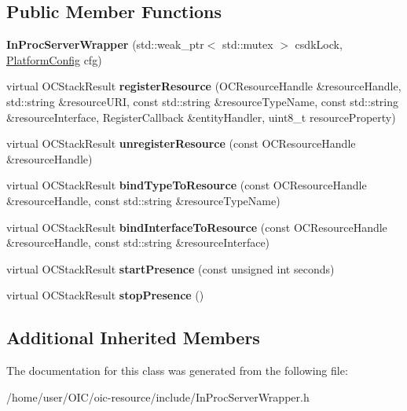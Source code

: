 \subsection*{Public Member Functions}
\begin{DoxyCompactItemize}
\item 
\hypertarget{classOC_1_1InProcServerWrapper_a7d57ed7b6fadd5136547470846f432c2}{}{\bfseries In\+Proc\+Server\+Wrapper} (std\+::weak\+\_\+ptr$<$ std\+::mutex $>$ csdk\+Lock, \hyperlink{structOC_1_1PlatformConfig}{Platform\+Config} cfg)\label{classOC_1_1InProcServerWrapper_a7d57ed7b6fadd5136547470846f432c2}

\item 
\hypertarget{classOC_1_1InProcServerWrapper_a1f539d6b9e35e56f585aa181de176d33}{}virtual O\+C\+Stack\+Result {\bfseries register\+Resource} (O\+C\+Resource\+Handle \&resource\+Handle, std\+::string \&resource\+U\+R\+I, const std\+::string \&resource\+Type\+Name, const std\+::string \&resource\+Interface, Register\+Callback \&entity\+Handler, uint8\+\_\+t resource\+Property)\label{classOC_1_1InProcServerWrapper_a1f539d6b9e35e56f585aa181de176d33}

\item 
\hypertarget{classOC_1_1InProcServerWrapper_a4d3186195070f4e3996ae19103bd9940}{}virtual O\+C\+Stack\+Result {\bfseries unregister\+Resource} (const O\+C\+Resource\+Handle \&resource\+Handle)\label{classOC_1_1InProcServerWrapper_a4d3186195070f4e3996ae19103bd9940}

\item 
\hypertarget{classOC_1_1InProcServerWrapper_afd20915bfc9effddccf6bd5f5869d453}{}virtual O\+C\+Stack\+Result {\bfseries bind\+Type\+To\+Resource} (const O\+C\+Resource\+Handle \&resource\+Handle, const std\+::string \&resource\+Type\+Name)\label{classOC_1_1InProcServerWrapper_afd20915bfc9effddccf6bd5f5869d453}

\item 
\hypertarget{classOC_1_1InProcServerWrapper_af8853a36566a2f654d50fccf0782d5f3}{}virtual O\+C\+Stack\+Result {\bfseries bind\+Interface\+To\+Resource} (const O\+C\+Resource\+Handle \&resource\+Handle, const std\+::string \&resource\+Interface)\label{classOC_1_1InProcServerWrapper_af8853a36566a2f654d50fccf0782d5f3}

\item 
\hypertarget{classOC_1_1InProcServerWrapper_a51116f23d4668a00e9f0ccf797f54b72}{}virtual O\+C\+Stack\+Result {\bfseries start\+Presence} (const unsigned int seconds)\label{classOC_1_1InProcServerWrapper_a51116f23d4668a00e9f0ccf797f54b72}

\item 
\hypertarget{classOC_1_1InProcServerWrapper_a831fe208084942ca65b350765cf4902e}{}virtual O\+C\+Stack\+Result {\bfseries stop\+Presence} ()\label{classOC_1_1InProcServerWrapper_a831fe208084942ca65b350765cf4902e}

\end{DoxyCompactItemize}
\subsection*{Additional Inherited Members}


The documentation for this class was generated from the following file\+:\begin{DoxyCompactItemize}
\item 
/home/user/\+O\+I\+C/oic-\/resource/include/In\+Proc\+Server\+Wrapper.\+h\end{DoxyCompactItemize}
